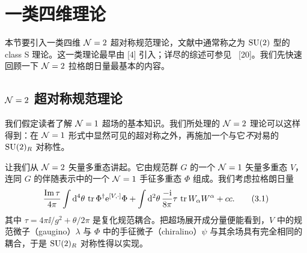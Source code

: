 

\section{一类四维理论}

本节要引入一类四维 $\mathcal{N}=2$ 超对称规范理论，文献中通常称之为 $\mathrm{SU}(2)$ 型的 class S 理论。这一类理论最早由 [4] 引入；详尽的综述可参见 \eg\ [20]。我们先快速回顾一下 $\mathcal{N}=2$ 拉格朗日量最基本的内容。


\subsection{$\mathcal{N}=2$ 超对称规范理论}

我们假定读者了解 $\mathcal{N}=1$ 超场的基本知识。我们所处理的 $\mathcal{N}=2$ 理论可以这样得到：在 $\mathcal{N}=1$ 形式中显然可见的超对称之外，再施加一个与它\emph{不}对易的 $\mathrm{SU}(2)_R$ 对称性。

让我们从 $\mathcal{N}=2$ 矢量多重态讲起。它由规范群 $G$ 的一个 $\mathcal{N}=1$ 矢量多重态 $V$，连同 $G$ 的伴随表示中的一个 $\mathcal{N}=1$ 手征多重态 $\Phi$ 组成。我们考虑拉格朗日量
\begin{equation}
  \frac{\operatorname{Im}\tau}{4\pi}\int \mathrm{d}^4\theta\, \operatorname{tr} \Phi^\dagger \mathrm{e}^{[V,\cdot]}\Phi
  + \int \mathrm{d}^2\theta\, \frac{-\mathrm{i}}{8\pi}\tau\, \operatorname{tr} W_\alpha W^\alpha + cc.
  \tag{3.1}
\end{equation}
其中 $\tau = 4\pi\ii/g^2 + \theta/2\pi$ 是复化规范耦合。把超场展开成分量便能看到，$V$ 中的规范微子（gaugino）$\lambda$ 与 $\Phi$ 中的手征微子（chiralino）$\psi$ 与其余场具有完全相同的耦合，于是 $\mathrm{SU}(2)_R$ 对称性得以实现。

